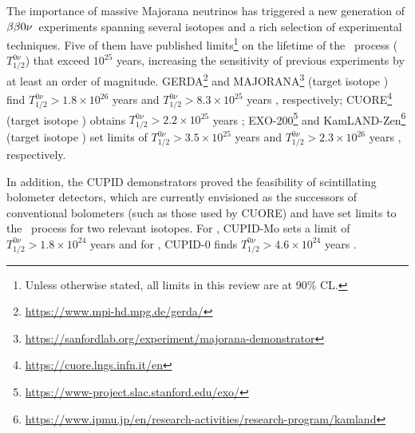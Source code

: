 The importance of massive Majorana neutrinos 
has triggered a new generation of $\beta\beta0\nu$~experiments spanning several isotopes and a rich selection of experimental techniques.
%
Five of them have published limits\footnote{Unless otherwise stated, all limits in this review are at 90\% CL.} on the lifetime of the \bbonu\ process ($T^{0\nu}_{1/2}$) that exceed $10^{25}$ years, increasing the sensitivity of previous  experiments by at least an order of magnitude. GERDA\footnote{\url{https://www.mpi-hd.mpg.de/gerda/}} and MAJORANA\footnote{\url{https://sanfordlab.org/experiment/majorana-demonstrator}} (target isotope ) find \mbox{$T^{0\nu}_{1/2} > 1.8 \times 10^{26}$} years \cite{GERDA:2020xhi} and \mbox{$T^{0\nu}_{1/2} > 8.3 \times 10^{25}$} years \cite{Majorana:2022udl}, respectively; CUORE\footnote{\url{https://cuore.lngs.infn.it/en}} (target isotope ) obtains \mbox{$T^{0\nu}_{1/2} > 2.2 \times 10^{25}$} years \cite{CUORE:2021mvw}; EXO-200\footnote{\url{https://www-project.slac.stanford.edu/exo/}} and KamLAND-Zen\footnote{\url{https://www.ipmu.jp/en/research-activities/research-program/kamland}} (target isotope ) set limits of \mbox{$T^{0\nu}_{1/2} > 3.5 \times 10^{25}$} years \cite{EXO-200:2019rkq} and \mbox{$T^{0\nu}_{1/2} > 2.3 \times 10^{26}$} years \cite{KamLAND-Zen:2022tow}, respectively. 
 
In addition, the CUPID demonstrators proved the feasibility of scintillating bolometer detectors, which are currently envisioned as the successors of conventional bolometers (such as those used by CUORE) and have set limits to the \bbonu\ process for two relevant isotopes. For , CUPID-Mo sets a limit of \mbox{$T^{0\nu}_{1/2} > 1.8 \times 10^{24}$} years \cite{Augier:2022znx} and for , CUPID-0 finds \mbox{$T^{0\nu}_{1/2} > 4.6 \times 10^{24}$} years \cite{CUPID:2022puj}. 

